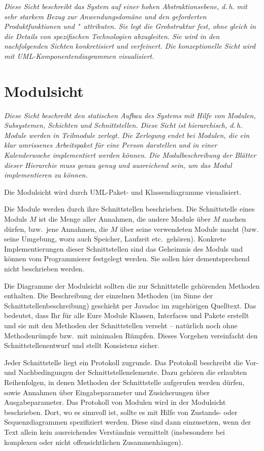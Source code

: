 \documentclass[fontsize=12pt,paper=a4,twoside]{scrartcl}
\begin{document}
{ \em Diese Sicht beschreibt das System auf einer hohen 
  Abstraktionsebene, d.\,h. mit sehr starkem Bezug zur 
  Anwendungsdomäne und den geforderten Produktfunktionen und 
  "~attributen. Sie legt die Grobstruktur fest, ohne gleich in die 
  Details von spezifischen Technologien abzugleiten. Sie wird in den 
  nachfolgenden Sichten konkretisiert und verfeinert. Die 
  konzeptionelle Sicht wird mit {UML}-Komponentendiagrammen 
  visualisiert.
}


\section{Modulsicht} \label{sec:modulsicht}

{ \em Diese Sicht beschreibt den statischen Aufbau des Systems mit 
  Hilfe von Modulen, Subsystemen, Schichten und Schnittstellen. Diese 
  Sicht ist hierarchisch, d.\,h. Module werden in Teilmodule zerlegt. 
  Die Zerlegung endet bei Modulen, die ein klar umrissenes 
  Arbeitspaket für eine Person darstellen und in einer Kalenderwoche 
  implementiert werden können. Die Modulbeschreibung der Blätter 
  dieser Hierarchie muss genau genug und ausreichend sein, um das 
  Modul implementieren zu können.

  Die Modulsicht wird durch {UML}-Paket- und Klassendiagramme 
  visualisiert.

  Die Module werden durch ihre Schnittstellen beschrieben.
  Die Schnittstelle eines Moduls $M$ ist die Menge aller Annahmen, die 
  andere Module über $M$ machen dürfen, bzw.\ jene Annahmen, die $M$ 
  über seine verwendeten Module macht (bzw. seine Umgebung, wozu auch 
  Speicher, Laufzeit etc.\ gehören).
  Konkrete Implementierungen dieser Schnittstellen sind das Geheimnis 
  des Moduls und können vom Programmierer festgelegt werden. Sie 
  sollen hier dementsprechend nicht beschrieben werden. 

  Die Diagramme der Modulsicht sollten die zur Schnittstelle 
  gehörenden Methoden enthalten. Die Beschreibung der einzelnen 
  Methoden (im Sinne der Schnittstellenbeschreibung) geschieht 
  per Javadoc im zugehörigen Quelltext. Das bedeutet, dass Ihr für 
  alle Eure Module Klassen, Interfaces und Pakete erstellt und sie mit 
  den Methoden der Schnittstellen verseht -- natürlich noch ohne 
  Methodenrümpfe bzw.\ mit minimalen Rümpfen. Dieses Vorgehen 
  vereinfacht den Schnittstellenentwurf und stellt Konsistenz sicher.

  Jeder Schnittstelle liegt ein Protokoll zugrunde. Das Protokoll 
  beschreibt die Vor- und Nachbedingungen der Schnittstellenelemente. 
  Dazu gehören die erlaubten Reihenfolgen, in denen Methoden der 
  Schnittstelle aufgerufen werden dürfen, sowie Annahmen über 
  Eingabeparameter und Zusicherungen über Ausgabeparameter. Das 
  Protokoll von Modulen wird in der Modulsicht beschrieben. Dort, wo 
  es sinnvoll ist, sollte es mit Hilfe von Zustands- oder 
  Sequenzdiagrammen spezifiziert werden. Diese sind dann einzusetzen, 
  wenn der Text allein kein ausreichendes Verständnis vermittelt 
  (insbesondere bei komplexen oder nicht offensichtlichen 
  Zusammenhängen).

}
\end{document}
